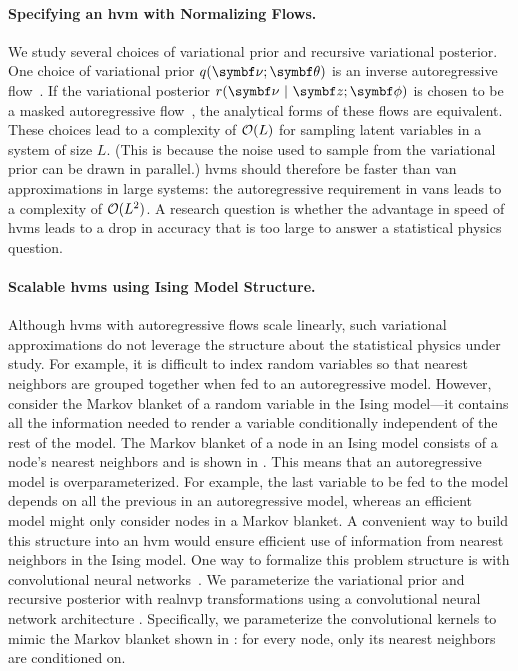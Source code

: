 \paragraph{Specifying an \gls{hvm} with Normalizing Flows.} We study several choices of variational prior and recursive variational posterior. One choice of variational prior $q(\mbnu; \mbtheta)$ is an inverse autoregressive flow~\citep{kingma2016improved}. If the variational posterior $r(\mbnu \mid \mbz; \mbphi)$ is chosen to be a masked autoregressive flow~\citep{papamakarios2017masked}, the analytical forms of these flows are equivalent. These choices lead to a complexity of $\mathcal{O}(L)$ for sampling latent variables in a system of size $L$. (This is because the noise used to sample from the variational prior can be drawn in parallel.) \glspl{hvm} should therefore be faster than \gls{van} approximations in large systems: the autoregressive requirement in \glspl{van} leads to a complexity of $\mathcal{O}(L^2)$. A research question is whether the advantage in speed of \glspl{hvm} leads to a drop in accuracy that is too large to answer a statistical physics question.


\paragraph{Scalable \glspl{hvm} using Ising Model Structure.} Although \glspl{hvm} with autoregressive flows scale linearly, such variational approximations do not leverage the structure about the statistical physics under study. For example, it is difficult to index random variables so that nearest neighbors are grouped together when fed to an autoregressive model. However, consider the Markov blanket of a random variable in the Ising model---it contains all the information needed to render a variable conditionally independent of the rest of the model. The Markov blanket of a node in an Ising model consists of a node's nearest neighbors and is shown in . This means that an autoregressive model is overparameterized. For example, the last variable to be fed to the model depends on all the previous in an autoregressive model, whereas an efficient model might only consider nodes in a Markov blanket. A convenient way to build this structure into an \gls{hvm} would ensure efficient use of information from nearest neighbors in the Ising model. One way to formalize this problem structure is with convolutional neural networks~\citep{lecun2015deep}. We parameterize the variational prior and recursive posterior with \gls{realnvp} transformations using a convolutional neural network architecture \citep{dinh2017density}. Specifically, we parameterize the convolutional kernels to mimic the Markov blanket shown in : for every node, only its nearest neighbors are conditioned on.